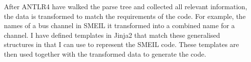 After ANTLR4 have walked the parse tree and collected all relevant information, the data is transformed to match the requirements of the \cspm{} code. For example, the names of a bus channel in SMEIL it transformed into a combined name for a \cspm{} channel. I have defined templates in Jinja2 that match these generalised structures in \cspm{} that I can use to represent the SMEIL code. These templates are then used together with the transformed data to generate the \cspm{} code.

%


